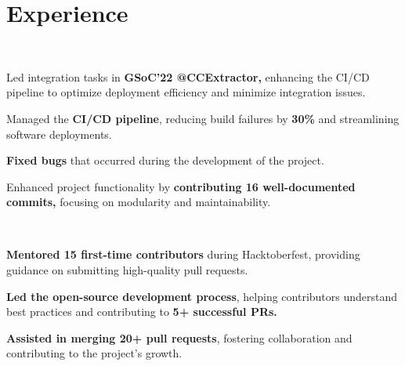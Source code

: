 \documentclass[]{deedy-resume-openfont}
\begin{document}

\section{Experience}
\vspace{0.4mm} 
\hfill {} \\
\vspace{0.7mm} 
\hfill {} 
\vspace{1.7mm}
\begin{tightemize}
	\item Led integration tasks in \textbf{GSoC'22 @CCExtractor,} enhancing the CI/CD pipeline to optimize deployment efficiency and minimize integration issues.
	\vspace{-1mm}
	\item Managed the \textbf{CI/CD pipeline}, reducing build failures by \textbf{30\%} and streamlining software deployments.
	\vspace{-1mm}
	\item \textbf{Fixed bugs} that occurred during the development of the project.
	\vspace{-1mm}
	\item Enhanced project functionality by \textbf{contributing 16 well-documented commits,} focusing on modularity and maintainability.
\end{tightemize}
\sectionsep

\vspace{0.4mm} 
\hfill {} \\
\vspace{0.7mm} 
\hfill {}
\vspace{1.7mm}
\begin{tightemize}
	\item \textbf{Mentored 15 first-time contributors} during Hacktoberfest, providing guidance on submitting high-quality pull requests.
	\vspace{-1mm}
	\item \textbf{Led the open-source development process}, helping contributors understand best practices and contributing to \textbf{5+ successful PRs.}
	\vspace{-1mm}
	\item \textbf{Assisted in merging 20+ pull requests}, fostering collaboration and contributing to the project's growth.
\end{tightemize}
\sectionsep
\end{document}
